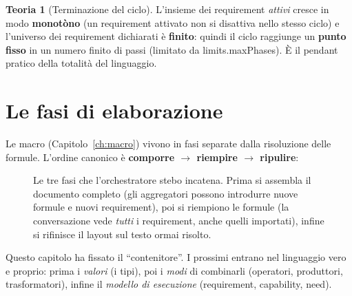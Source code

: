 \documentclass[11pt,a4paper]{book}
\newcommand{\ic}[1]{{\ttfamily #1}}
\theoremstyle{definition}
\newtheorem*{teoria}{Teoria}
\begin{document}
{{{{\begin{teoria}[Terminazione del ciclo]
L'insieme dei requirement \emph{attivi} cresce in modo \textbf{monotòno} (un
requirement attivato non si disattiva nello stesso ciclo) e l'universo dei
requirement dichiarati è \textbf{finito}: quindi il ciclo raggiunge un
\textbf{punto fisso} in un numero finito di passi (limitato da
\ic{limits.maxPhases}). È il pendant pratico della totalità del linguaggio.
\end{teoria}

\section{Le fasi di elaborazione}

Le macro (Capitolo~\ref{ch:macro}) vivono in fasi separate dalla risoluzione
delle formule. L'ordine canonico è \textbf{comporre $\rightarrow$ riempire
$\rightarrow$ ripulire}:

\begin{figure}[h]
\centering
{}
\caption{Le tre fasi che l'orchestratore \ic{stebo} incatena. Prima si assembla
il documento completo (gli aggregatori possono introdurre nuove formule e nuovi
requirement), poi si riempiono le formule (la conversazione vede \emph{tutti} i
requirement, anche quelli importati), infine si rifinisce il layout sul testo
ormai risolto.}
\label{fig:fasi}
\end{figure}

Questo capitolo ha fissato il ``contenitore''. I prossimi entrano nel linguaggio
vero e proprio: prima i \emph{valori} (i tipi), poi i \emph{modi} di combinarli
(operatori, produttori, trasformatori), infine il \emph{modello di esecuzione}
(requirement, capability, need).

}}}}
\end{document}
